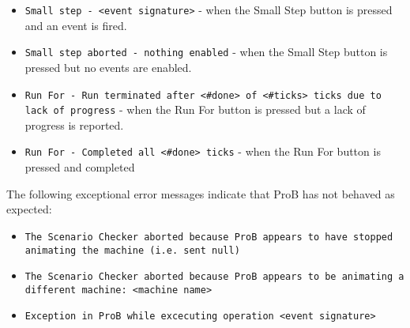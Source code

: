\begin{itemize}
\begin{itemize}
	\end{itemize}
	\item \texttt{Small step - <event signature>} - when the Small Step button is pressed and an event is fired.
	\item \texttt{Small step aborted - nothing enabled} - when the Small Step button is pressed but no events are enabled.
	\item \texttt{Run For - Run terminated after <\#done> of <\#ticks> ticks due to lack of progress} - when the Run For button is pressed but a lack of progress is reported.
	\item \texttt{Run For - Completed all <\#done> ticks} - when the Run For button is pressed and completed
\end{itemize}

The following exceptional error messages indicate that ProB has not behaved as expected:
\begin{itemize}
	\item \texttt{The Scenario Checker aborted because ProB appears to have stopped animating the machine (i.e. sent null)}
	\item \texttt{The Scenario Checker aborted because ProB appears to be animating a different machine: <machine name>}
	\item \texttt{Exception in ProB while excecuting operation <event signature>}
\end{itemize}

